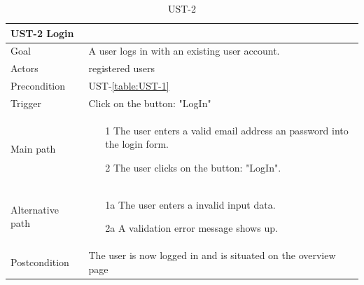 \documentclass[titlepage, 12pt]{article}
\begin{document}
\begin{table}[H]
  \begin{center}

    \begin{tabular}{p{4cm}|p{10cm}}
      \textbf{UST-2 Login}                                                              \\
      \hline
      Goal             & A user logs in with an existing user account.                  \\
      \hline
      Actors           & registered users                                               \\
      \hline
      Precondition     & UST-\ref{table:UST-1}                                          \\
      \hline
      Trigger          & Click on the button: "LogIn"                                   \\
      \hline
      Main path        &
      \begin{itemize}
        \item [1] The user enters a valid email address an password into the login form.
        \item [2] The user clicks on the button: "LogIn".
      \end{itemize}                                                         \\
      \hline
      Alternative path &
      \begin{itemize}
        \item [1a] The user enters a invalid input data.
        \item [2a] A validation error message shows up.
      \end{itemize}                                                         \\
      \hline
      Postcondition    & The user is now logged in and is situated on the overview page \\
    \end{tabular}

    \caption{UST-2}
    \label{table:UST-2}

  \end{center}
\end{table}
\end{document}

